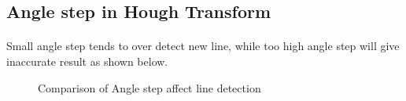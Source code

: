 \documentclass[12pt,a4paper]{report}
\begin{document}
\clearpage


\subsection{Angle step in Hough Transform}
\paragraph*{}
Small angle step tends to over detect new line, while too high angle step will give inaccurate result as shown below.

\begin{figure}[!htb]
    \begin{minipage}{\linewidth}
        \centering
        \begin{subfigure}{0.49\textwidth}
        \end{subfigure}
        \begin{subfigure}{0.49\textwidth}
        \end{subfigure}

        \begin{subfigure}{0.49\textwidth}
        \end{subfigure}
        \begin{subfigure}{0.49\textwidth}
        \end{subfigure}

        \caption{Comparison of Angle step affect line detection}
    \end{minipage}

\end{figure}
\end{document}
